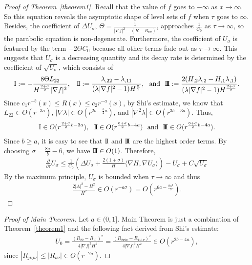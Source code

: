 \documentclass[12pt,a4paper]{amsart}
\begin{document}
\begin{proof}[Proof of Theorem~\ref{theorem1}]
Recall that the value of $f$ goes to $-\infty$ as $x\to\infty$.
So this equation reveals the asymptotic shape of level sets of $f$ when $\tau$ goes to $\infty$.
Besides, the coefficient of $\Delta U_\sigma$, $\Theta = \frac{1}{|\nabla f|^2-(R-R_{\nu\nu})}$, approaches $\frac{1}{C_0}$ as $\tau\to\infty$,
so the parabolic equation is non-degenerate.
Furthermore, the coefficient of $U_\sigma$ is featured by the term $-2\Theta C_0$ because all other terms fade out as $\tau\to\infty$.
This suggests that $U_\sigma$ is a decreasing quantity and its decay rate is determined by the coefficient of $\sqrt{U_\sigma}$, which consists of
\begin{align*}
{\rm I}:=-\frac{8\Theta L_{22}}{ H^{\frac{2+\sigma}{2}}|\nabla f|^{3}},
\hspace{3mm}{\rm I\!I}:=\frac{\lambda_{,22}-\lambda_{,11}}{(\lambda|\nabla f|^2-1)H^{\frac{\sigma}{2}}},
\ \mbox{ and }\ {\rm I\!I\!I}:=\frac{2(H_{,2}\lambda_{,2}-H_{,1}\lambda_{,1})}{(\lambda|\nabla f|^2-1)H^{\frac{2+\sigma}{2}}}.
\end{align*}
Since $c_1 r^{-b}(x)\leq R(x)\leq c_2 r^{-a}(x)$,
by Shi's estimate, we know that $L_{22}\in O(r^{-3a})$,
$|\nabla \lambda| \in O(r^{2b-\frac{3}{2}a})$, and $\left|\nabla^2\lambda\right| \in O(r^{3b-3a})$.
Thus,
\begin{align*}
{\rm I} \in O(r^{\frac{2+\sigma}{2}b -3a}), \ \ {\rm I\!I} \in O(r^{\frac{6+\sigma}{2}b-4a}) \
\mbox{ and }\ {\rm I\!I\!I} \in O(r^{\frac{6+\sigma}{2}b -4a}).
\end{align*}
Since $b\geq a$, it is easy to see that ${\rm I\!I}$ and ${\rm I\!I\!I}$ are the highest order terms.
By choosing $\sigma=\frac{8a}{b}-6$, we have ${\rm I\!I\!I}\in O(1)$.
Therefore,
\begin{align*}
\frac{\partial}{\partial \tau} U_\sigma
\leq\frac{1}{C_0}\left(\Delta U_{\sigma}+\frac{2(1+\sigma)}{H}\langle\nabla H,\nabla U_{\sigma}\rangle\right)-U_{\sigma}+C\sqrt{U_\sigma}
\end{align*}
By the maximum principle, $U_\sigma$ is bounded when $\tau\to\infty$ and thus
\begin{align*}
\frac{2|A|^2-H^2}{H^2}\in O(r^{-a\sigma})=O\left(r^{6a-\frac{8a^2}{b}}\right).
\end{align*}
\end{proof}

\begin{proof}[Proof of Main Theorem]
Let $a\in(0,1]$. Main Theorem is just a combination of Theorem~\ref{theorem1} and the
following fact derived from Shi's estimate:
\begin{align*}
U_0=\frac{(R_{22}-R_{11})^2}{4|\nabla f|^2H^2}=\frac{(R_{2\nu 2\nu}-R_{1\nu 1\nu})^2}{4|\nabla f|^2H^2}\in O(r^{2b-4a}),
\end{align*}
since $|R_{j\nu j\nu} |\leq |R_{\nu\nu}|\in O(r^{-2a})$.
\end{proof}



\end{document}
